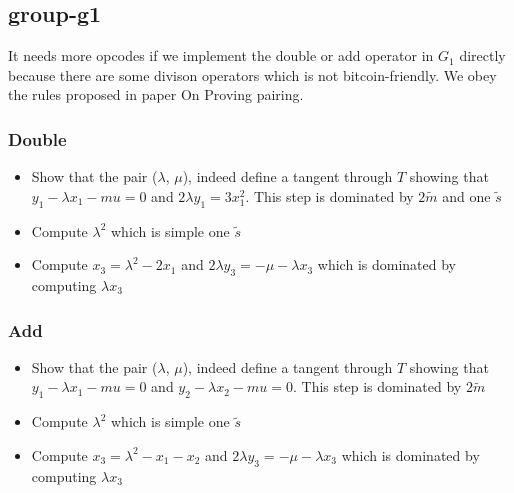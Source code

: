 \subsection{group-g1}

It needs more opcodes if we implement the double or add operator in $G_1$ directly because there are some divison operators which
is not bitcoin-friendly. We obey the rules proposed in paper On Proving pairing.


\subsubsection{Double}

\begin{itemize}
    \item Show that the pair ($\lambda$, $\mu$), indeed define a tangent through $T$ showing that $\displaystyle y_1 - \lambda x_{1} - mu = 0$ 
    and $\displaystyle 2\lambda y_1 = 3x_1^2$. This step is dominated by $2\tilde{m}$ and one $\tilde{s}$
    \item Compute $\lambda^2$ which is simple one $\tilde{s}$
    \item Compute $\displaystyle x_3 = \lambda^2-2x_1$ and $\displaystyle 2\lambda y_3 = -\mu - \lambda x_3$ which is dominated by computing $\lambda x_3$
\end{itemize}

\subsubsection{Add}

\begin{itemize}
    \item Show that the pair ($\lambda$, $\mu$), indeed define a tangent through $T$ showing that $\displaystyle y_1 - \lambda x_{1} - mu = 0$ 
    and $\displaystyle y_2 - \lambda x_{2} - mu = 0$. This step is dominated by $2\tilde{m}$
    \item Compute $\lambda^2$ which is simple one $\tilde{s}$
    \item Compute $\displaystyle x_3 = \lambda^2-x_1-x_2$ and $\displaystyle 2\lambda y_3 = -\mu - \lambda x_3$ which is dominated by computing $\lambda x_3$
\end{itemize}